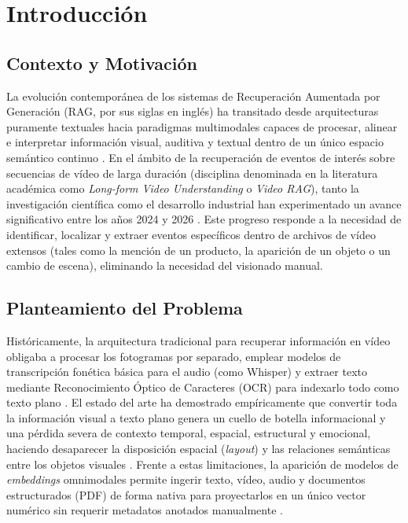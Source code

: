 \section{Introducción}
\label{sec:introduccion}

\subsection{Contexto y Motivación}
La evolución contemporánea de los sistemas de Recuperación Aumentada por Generación (RAG, por sus siglas en inglés) ha transitado desde arquitecturas puramente textuales hacia paradigmas multimodales capaces de procesar, alinear e interpretar información visual, auditiva y textual dentro de un único espacio semántico continuo \cite{prajwal2025multimodal}. En el ámbito de la recuperación de eventos de interés sobre secuencias de vídeo de larga duración (disciplina denominada en la literatura académica como \textit{Long-form Video Understanding} o \textit{Video RAG}), tanto la investigación científica como el desarrollo industrial han experimentado un avance significativo entre los años 2024 y 2026 \cite{multi_rag2025}. Este progreso responde a la necesidad de identificar, localizar y extraer eventos específicos dentro de archivos de vídeo extensos (tales como la mención de un producto, la aparición de un objeto o un cambio de escena), eliminando la necesidad del visionado manual.

\subsection{Planteamiento del Problema}
Históricamente, la arquitectura tradicional para recuperar información en vídeo obligaba a procesar los fotogramas por separado, emplear modelos de transcripción fonética básica para el audio (como Whisper) y extraer texto mediante Reconocimiento Óptico de Caracteres (OCR) para indexarlo todo como texto plano \cite{video_rag2024}. El estado del arte ha demostrado empíricamente que convertir toda la información visual a texto plano genera un cuello de botella informacional y una pérdida severa de contexto temporal, espacial, estructural y emocional, haciendo desaparecer la disposición espacial (\textit{layout}) y las relaciones semánticas entre los objetos visuales \cite{prajwal2025multimodal}. Frente a estas limitaciones, la aparición de modelos de \textit{embeddings} omnimodales permite ingerir texto, vídeo, audio y documentos estructurados (PDF) de forma nativa para proyectarlos en un único vector numérico sin requerir metadatos anotados manualmente \cite{gemini_emb2_docs}.

